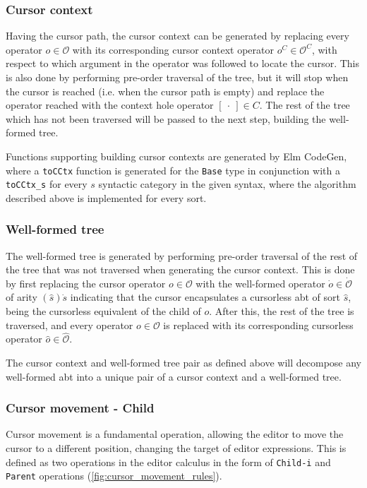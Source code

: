 \documentclass[sigplan,review]{acmart}
\newcommand{\abt}{\textsf{abt}\xspace}
\begin{document}
\subsubsection{Cursor context}

Having the cursor path, the cursor context can be generated by replacing every
operator $o \in \mathcal{O}$ with its corresponding cursor context operator
$o^C \in \mathcal{O}^C$, with respect to which argument in the operator was
followed to locate the cursor. This is also done by performing pre-order traversal
of the tree, but it will stop when the cursor is reached (i.e. when the
cursor path is empty) and replace the operator reached with the
context hole operator $[ \ \cdot \ ] \in C$. The rest of the tree which has not
been traversed will be passed to the next step, building the well-formed tree.

Functions supporting building cursor contexts are generated by Elm CodeGen, where a \texttt{toCCtx} function is generated
for the \texttt{Base} type in conjunction with a
\texttt{toCCtx\_s} for every $s$ syntactic category in the given syntax, where
the algorithm described above is implemented for every sort.

\subsubsection{Well-formed tree}

The well-formed tree is generated by performing pre-order traversal of the
rest of the tree that was not traversed when generating the cursor context.
This is done by first replacing the cursor operator $o \in \mathcal{O}$ with the well-formed operator
$\dot{o} \in \dot{\mathcal{O}}$ of arity $(\hat{s})\dot{s}$ indicating that the
cursor encapsulates a cursorless \abt of sort $\hat{s}$, being the cursorless equivalent of the child of $o$.
After this, the rest of the tree is traversed, and every operator $o \in \mathcal{O}$
is replaced with its corresponding cursorless operator $\hat{o} \in \hat{\mathcal{O}}$.

The cursor context and well-formed tree pair as defined above will decompose
any well-formed \abt into a unique pair of a cursor context and a well-formed tree.


\subsubsection{Cursor movement - Child}
Cursor movement is a fundamental operation, allowing the editor to move the cursor
to a different position, changing the target of editor expressions. This is defined
as two operations in the editor calculus in the form of
\texttt{Child-i} and \texttt{Parent} operations (\cref{fig:cursor_movement_rules}).
\end{document}
